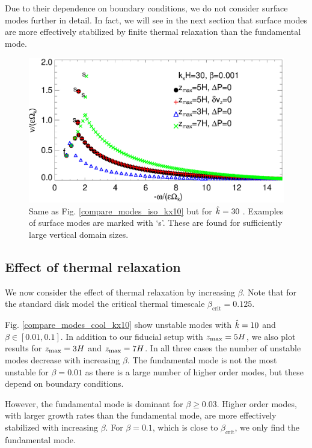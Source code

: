 Due to their dependence on boundary conditions, we 
do not consider surface modes further in detail. In fact, we will see
in the next section that surface modes are more effectively stabilized
by finite thermal relaxation than the fundamental mode. %

\begin{figure}
  \includegraphics[width=\linewidth]{figures/compare_modes_iso_kx30_tags.ps}
  \caption{Same as Fig. \ref{compare_modes_iso_kx10} but for $\hat{k}=30$
    \label{compare_modes_iso_kx30}. Examples of surface modes are
    marked with `s'. These are found for sufficiently large vertical
    domain sizes. 
  }
\end{figure}


\subsection{Effect of thermal relaxation}\label{therm_relax_eff}
We now consider the effect of thermal relaxation by increasing
$\beta$. Note that for the standard disk model the critical thermal 
timescale $\beta_\mathrm{crit} = 0.125$.  

Fig. \ref{compare_modes_cool_kx10} show unstable modes with $\hat{k}=10$
and $\beta\in[0.01,0.1]$. In addition to our fiducial setup with 
$z_\mathrm{max}=5H$, we also plot results for $z_\mathrm{max}=3H$ and $z_\mathrm{max}=7H$. In all
three cases the number of unstable modes decrease with increasing
$\beta$. The fundamental mode is not the most unstable for 
$\beta=0.01$ as there is a large number of higher order modes, but
these depend on boundary conditions.  

However, the fundamental mode is dominant for $\beta \geq 
0.03$. Higher order modes, with larger growth rates than the
fundamental mode, are more effectively stabilized with increasing 
$\beta$. For $\beta=0.1$, which is close to $\beta_\mathrm{crit}$, we
only find the fundamental mode. 

